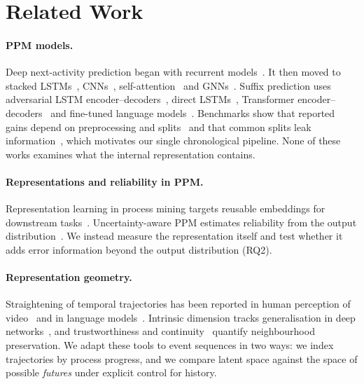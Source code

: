 \section{Related Work}\label{sec:related}

\paragraph{PPM models.}
Deep next-activity prediction began with recurrent
models~\cite{evermann2017deep,tax2017lstm}. It then moved to stacked
LSTMs~\cite{camargo2019lstm}, CNNs~\cite{dimauro2019inception},
self-attention~\cite{bukhsh2021processtransformer} and
GNNs~\cite{dissegna2025gnn,wang2025rlhgnn}. Suffix prediction uses adversarial
LSTM encoder--decoders~\cite{taymouri2021mlmme}, direct
LSTMs~\cite{gunnarsson2023crtp}, Transformer encoder--decoders~\cite{wuyts2024sutran}
and fine-tuned language models~\cite{pasquadibisceglie2024lupin}. Benchmarks
show that reported gains depend on preprocessing and
splits~\cite{rama2022review} and that common splits leak
information~\cite{weytjens2022leakage}, which motivates our single
chronological pipeline. None of these works examines what the internal
representation contains.

\paragraph{Representations and reliability in PPM.}
Representation learning in process mining targets reusable embeddings for
downstream tasks~\cite{dekoninck2018act2vec,teinemaa2019outcome}.
Uncertainty-aware PPM estimates reliability from the output
distribution~\cite{weytjens2022uncertainty}. We instead measure the
representation itself and test whether it adds error information beyond the
output distribution (RQ2).

\paragraph{Representation geometry.}
Straightening of temporal trajectories has been reported in human perception
of video~\cite{henaff2019straightening} and in language
models~\cite{hosseini2023straighten}. Intrinsic dimension tracks
generalisation in deep networks~\cite{ansuini2019intrinsic}, and
trustworthiness and continuity~\cite{venna2001neighborhood} quantify
neighbourhood preservation. We adapt these tools to event sequences in two
ways: we index trajectories by process progress, and we compare latent space
against the space of possible \emph{futures} under explicit control for
history.
